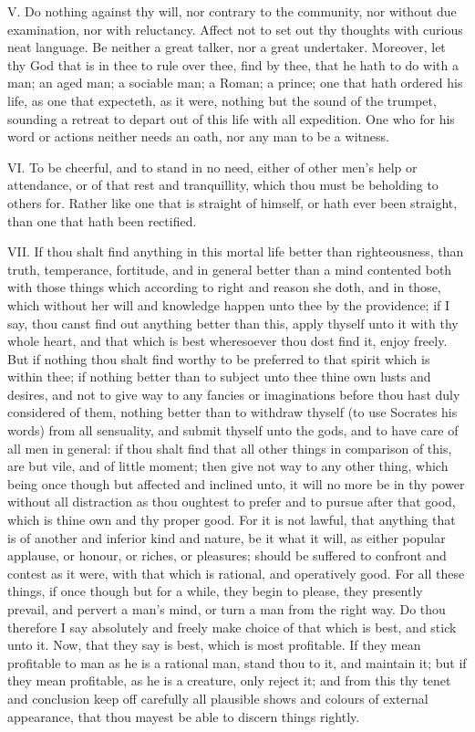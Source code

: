 V. Do nothing against thy will, nor contrary to the community, nor
without due examination, nor with reluctancy. Affect not to set out thy
thoughts with curious neat language. Be neither a great talker, nor a
great undertaker. Moreover, let thy God that is in thee to rule over thee,
find by thee, that he hath to do with a man; an aged man; a sociable man;
a Roman; a prince; one that hath ordered his life, as one that expecteth,
as it were, nothing but the sound of the trumpet, sounding a retreat to
depart out of this life with all expedition. One who for his word or
actions neither needs an oath, nor any man to be a witness.

VI. To be cheerful, and to stand in no need, either of other men's help
or attendance, or of that rest and tranquillity, which thou must be
beholding to others for. Rather like one that is straight of himself, or
hath ever been straight, than one that hath been rectified.

VII. If thou shalt find anything in this mortal life better than
righteousness, than truth, temperance, fortitude, and in general better
than a mind contented both with those things which according to right and
reason she doth, and in those, which without her will and knowledge happen
unto thee by the providence; if I say, thou canst find out anything better
than this, apply thyself unto it with thy whole heart, and that which is
best wheresoever thou dost find it, enjoy freely. But if nothing thou
shalt find worthy to be preferred to that spirit which is within thee; if
nothing better than to subject unto thee thine own lusts and desires, and
not to give way to any fancies or imaginations before thou hast duly
considered of them, nothing better than to withdraw thyself (to use
Socrates his words) from all sensuality, and submit thyself unto the gods,
and to have care of all men in general: if thou shalt find that all other
things in comparison of this, are but vile, and of little moment; then
give not way to any other thing, which being once though but affected and
inclined unto, it will no more be in thy power without all distraction as
thou oughtest to prefer and to pursue after that good, which is thine own
and thy proper good. For it is not lawful, that anything that is of
another and inferior kind and nature, be it what it will, as either
popular applause, or honour, or riches, or pleasures; should be suffered
to confront and contest as it were, with that which is rational, and
operatively good. For all these things, if once though but for a while,
they begin to please, they presently prevail, and pervert a man's mind, or
turn a man from the right way. Do thou therefore I say absolutely and
freely make choice of that which is best, and stick unto it. Now, that
they say is best, which is most profitable. If they mean profitable to man
as he is a rational man, stand thou to it, and maintain it; but if they
mean profitable, as he is a creature, only reject it; and from this thy
tenet and conclusion keep off carefully all plausible shows and colours of
external appearance, that thou mayest be able to discern things rightly.

